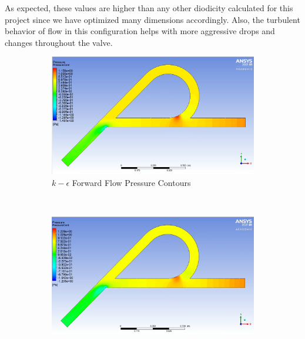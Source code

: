 \begin{table}[H]
\centering
\caption{Comparison of Diodicities}
\label{tab:compared_diodicities}
\end{table}

As expected, these values are higher than any other diodicity calculated for this project since we have optimized many dimensions accordingly. Also, the turbulent behavior of flow in this configuration helps with more aggressive drops and changes throughout the valve.

\begin{figure}[H]
 \centering
\begin{subfigure}{.45\textwidth}
  \centering
  \includegraphics[width=.94\linewidth]{images/task3/epsilon_forward_pressure.png}
  \caption{$k-\epsilon$ Forward Flow Pressure Contours}
  \label{fig:x_d_norm}
\end{subfigure}%
~
\begin{subfigure}{.45\textwidth}
  \centering
  \includegraphics[width=.94\linewidth]{images/task3/omega_forward_pressure.png}

\end{subfigure}
\end{figure}
